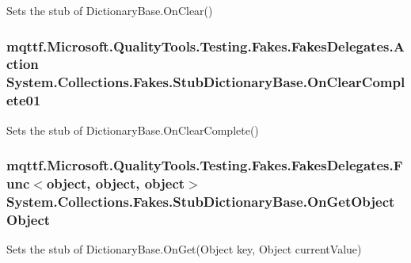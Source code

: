 Sets the stub of Dictionary\-Base.\-On\-Clear()

\hypertarget{class_system_1_1_collections_1_1_fakes_1_1_stub_dictionary_base_a74fa88a288f241bd855eaac343782c79}{
\subsubsection[{On\-Clear\-Complete01}]{\setlength{\rightskip}{0pt plus 5cm}mqttf.\-Microsoft.\-Quality\-Tools.\-Testing.\-Fakes.\-Fakes\-Delegates.\-Action System.\-Collections.\-Fakes.\-Stub\-Dictionary\-Base.\-On\-Clear\-Complete01}}\label{class_system_1_1_collections_1_1_fakes_1_1_stub_dictionary_base_a74fa88a288f241bd855eaac343782c79}


Sets the stub of Dictionary\-Base.\-On\-Clear\-Complete()

\hypertarget{class_system_1_1_collections_1_1_fakes_1_1_stub_dictionary_base_aad23a67c46ba40a85633662549e31360}{
\subsubsection[{On\-Get\-Object\-Object}]{\setlength{\rightskip}{0pt plus 5cm}mqttf.\-Microsoft.\-Quality\-Tools.\-Testing.\-Fakes.\-Fakes\-Delegates.\-Func$<$object, object, object$>$ System.\-Collections.\-Fakes.\-Stub\-Dictionary\-Base.\-On\-Get\-Object\-Object}}\label{class_system_1_1_collections_1_1_fakes_1_1_stub_dictionary_base_aad23a67c46ba40a85633662549e31360}


Sets the stub of Dictionary\-Base.\-On\-Get(\-Object key, Object current\-Value)


